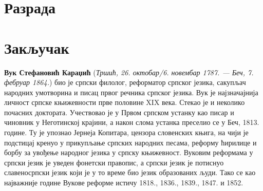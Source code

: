 \documentclass[12pt,oneside]{memoir}
\begin{document}
\chapter{Разрада}
\label{chp:razrada}

\pangrami

\pangrami

\chapter{Закључак}
\pangrami

\pangrami

\literatura

\backmatter

\begin{biografija}
\textbf{Вук Стефановић Караџић} (\emph{Тршић, 26. октобар/6. новембар
  1787. — Беч, 7. фебруар 1864.}) био је српски филолог, реформатор
српског језика, сакупљач народних умотворина и писац првог речника
српског језика.  Вук је најзначајнија личност српске књижевности прве
половине XIX века. Стекао је и неколико почасних доктората.
Учествовао је у Првом српском устанку као писар и чиновник у
Неготинској крајини, а након слома устанка преселио се у Беч,
1813. године. Ту је упознао Јернеја Копитара, цензора словенских
књига, на чији је подстицај кренуо у прикупљање српских народних
песама, реформу ћирилице и борбу за увођење народног језика у српску
књижевност. Вуковим реформама у српски језик је уведен фонетски
правопис, а српски језик је потиснуо славеносрпски језик који је у то
време био језик образованих људи. Тако се као најважније године Вукове
реформе истичу 1818., 1836., 1839., 1847. и 1852.
\end{biografija}
\end{document}
